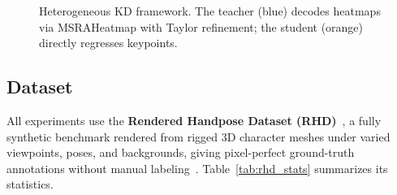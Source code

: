 \documentclass[11pt,conference,a4paper]{APSIPA2026}
\begin{document}
\begin{figure}[htbp]
{%
}
\caption{Heterogeneous KD framework. The teacher (blue) decodes
heatmaps via MSRAHeatmap with Taylor refinement; the student (orange)
directly regresses keypoints.}
\label{fig:framework}
\end{figure}

\subsection{Dataset}

All experiments use the \textbf{Rendered Handpose Dataset (RHD)}~\cite{zimmermann2017learning},
a fully synthetic benchmark rendered from rigged 3D character meshes
under varied viewpoints, poses, and backgrounds, giving pixel-perfect
ground-truth annotations without manual labeling~\cite{hand3d_github}.
Table~\ref{tab:rhd_stats} summarizes its statistics.
\end{document}
